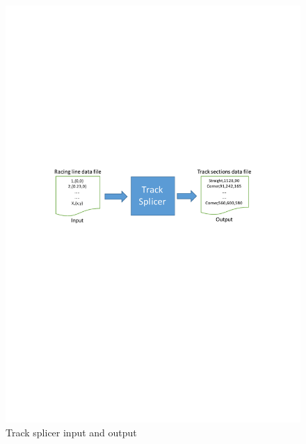 \begin{figure}[!htb]
	\centering
	\includegraphics[width=\textwidth]{diagrams/trackspliceinputoutput.pdf}
	\caption[track splicer input out]{Track splicer input and output}
	\label{fig:diagram-trackspliceinputoutput}
\end{figure}

